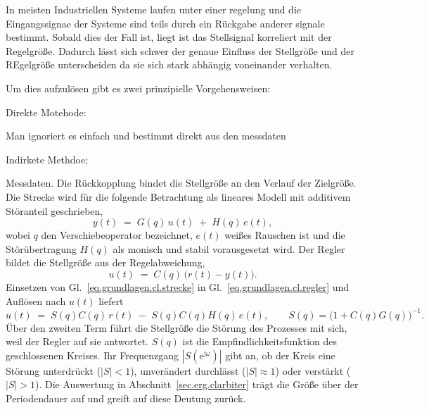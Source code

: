 In meisten Industriellen Systeme laufen unter einer regelung und die Eingangssignae der Systeme sind teils durch ein Rückgabe anderer signale bestimmt. Sobald dies der Fall ist, liegt ist das Stellsignal korreliert mit der Regelgröße. Dadurch lässt sich schwer der genaue Einfluss der Stellgröße und der REgelgröße unterscheiden da sie sich stark abhängig voneinander verhalten.

Um dies aufzulösen gibt es zwei prinzipielle Vorgehensweisen:

Direkte Motehode:

Man ignoriert es einfach und bestimmt direkt aus den messdaten

Indirkete Methdoe;


Messdaten. Die Rückkopplung bindet die Stellgröße an den Verlauf der
Zielgröße. Die Strecke wird für die folgende Betrachtung als lineares
Modell mit additivem Störanteil geschrieben,
\begin{equation}
  \label{eq.grundlagen.cl.strecke}
  y(t) \;=\; G(q)\,u(t) \;+\; H(q)\,e(t),
\end{equation}
wobei $q$ den Verschiebeoperator bezeichnet, $e(t)$ weißes Rauschen ist
und die Störübertragung $H(q)$ als monisch und stabil vorausgesetzt
wird. Der Regler bildet die Stellgröße aus der Regelabweichung,
\begin{equation}
  \label{eq.grundlagen.cl.regler}
  u(t) \;=\; C(q)\,\bigl(r(t) - y(t)\bigr).
\end{equation}
Einsetzen von Gl.~\eqref{eq.grundlagen.cl.strecke} in
Gl.~\eqref{eq.grundlagen.cl.regler} und Auflösen nach $u(t)$ liefert
\begin{equation}
  \label{eq.grundlagen.cl.u}
  u(t) \;=\; S(q)C(q)\,r(t) \;-\; S(q)C(q)H(q)\,e(t),
  \qquad S(q) = \bigl(1 + C(q)G(q)\bigr)^{-1}.
\end{equation}
Über den zweiten Term führt die Stellgröße die Störung des Prozesses
mit sich, weil der Regler auf sie antwortet.
$S(q)$ ist die Empfindlichkeitsfunktion des geschlossenen Kreises. Ihr
Frequenzgang $|S(\mathrm e^{\mathrm j\omega})|$ gibt an, ob der Kreis
eine Störung unterdrückt ($|S| < 1$), unverändert durchlässt
($|S| \approx 1$) oder verstärkt ($|S| > 1$). Die Auswertung in
Abschnitt~\ref{sec.erg.clarbiter} trägt die Größe über der
Periodendauer auf und greift auf diese Deutung zurück.

